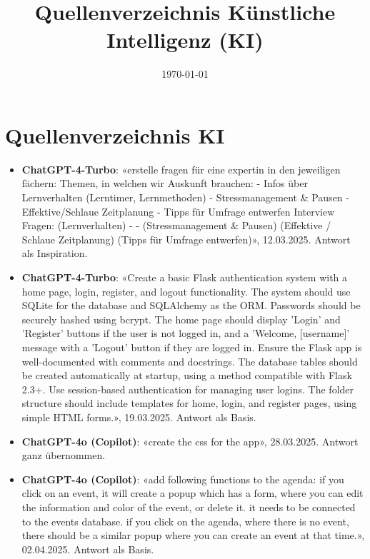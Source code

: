 \documentclass[12pt, a4paper]{article}
\title{Quellenverzeichnis Künstliche Intelligenz (KI)}
\author{}
\date{\today}
\begin{document}
\maketitle
\thispagestyle{empty}
\vspace*{1cm}

\section*{Quellenverzeichnis KI}

\begin{itemize}

    \item \textbf{ChatGPT-4-Turbo}: «erstelle fragen für eine expertin in den jeweiligen fächern: Themen, in welchen wir Auskunft brauchen: - Infos über Lernverhalten (Lerntimer, Lernmethoden) - Stressmanagement \& Pausen - Effektive/Schlaue Zeitplanung - Tipps für Umfrage entwerfen Interview Fragen: (Lernverhalten) - - (Stressmanagement \& Pausen) (Effektive / Schlaue Zeitplanung) (Tipps für Umfrage entwerfen)», 12.03.2025. Antwort als Inspiration.
    
    \item \textbf{ChatGPT-4-Turbo}: «Create a basic Flask authentication system with a home page, login, register, and logout functionality. The system should use SQLite for the database and SQLAlchemy as the ORM. Passwords should be securely hashed using bcrypt. The home page should display 'Login' and 'Register' buttons if the user is not logged in, and a 'Welcome, [username]' message with a 'Logout' button if they are logged in. Ensure the Flask app is well-documented with comments and docstrings. The database tables should be created automatically at startup, using a method compatible with Flask 2.3+. Use session-based authentication for managing user logins. The folder structure should include templates for home, login, and register pages, using simple HTML forms.», 19.03.2025. Antwort als Basis.
    
    \item \textbf{ChatGPT-4o (Copilot)}: «create the css for the app», 28.03.2025. Antwort ganz übernommen.
    
    \item \textbf{ChatGPT-4o (Copilot)}: «add following functions to the agenda: if you click on an event, it will create a popup which has a form, where you can edit the information and color of the event, or delete it. it needs to be connected to the events database. if you click on the agenda, where there is no event, there should be a similar popup where you can create an event at that time.», 02.04.2025. Antwort als Basis.
    

\end{itemize}
\end{document}
